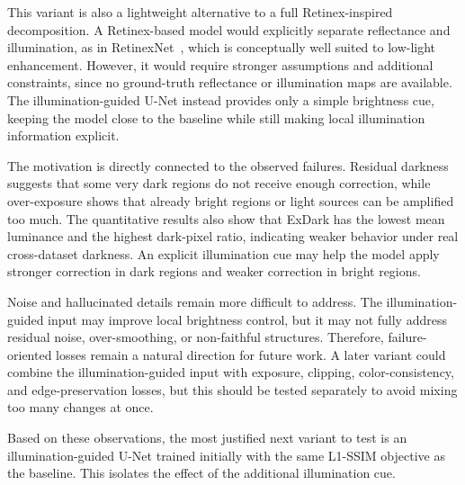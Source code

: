 This variant is also a lightweight alternative to a full Retinex-inspired decomposition. A Retinex-based model would explicitly separate reflectance and illumination, as in RetinexNet~\cite{DBLP:conf/bmvc/WeiWY018}, which is conceptually well suited to low-light enhancement. However, it would require stronger assumptions and additional constraints, since no ground-truth reflectance or illumination maps are available. The illumination-guided U-Net instead provides only a simple brightness cue, keeping the model close to the baseline while still making local illumination information explicit.

The motivation is directly connected to the observed failures. Residual darkness suggests that some very dark regions do not receive enough correction, while over-exposure shows that already bright regions or light sources can be amplified too much. The quantitative results also show that ExDark has the lowest mean luminance and the highest dark-pixel ratio, indicating weaker behavior under real cross-dataset darkness. An explicit illumination cue may help the model apply stronger correction in dark regions and weaker correction in bright regions.

Noise and hallucinated details remain more difficult to address. The illumination-guided input may improve local brightness control, but it may not fully address residual noise, over-smoothing, or non-faithful structures. Therefore, failure-oriented losses remain a natural direction for future work. A later variant could combine the illumination-guided input with exposure, clipping, color-consistency, and edge-preservation losses, but this should be tested separately to avoid mixing too many changes at once.

Based on these observations, the most justified next variant to test is an illumination-guided U-Net trained initially with the same L1-SSIM objective as the baseline. This isolates the effect of the additional illumination cue.